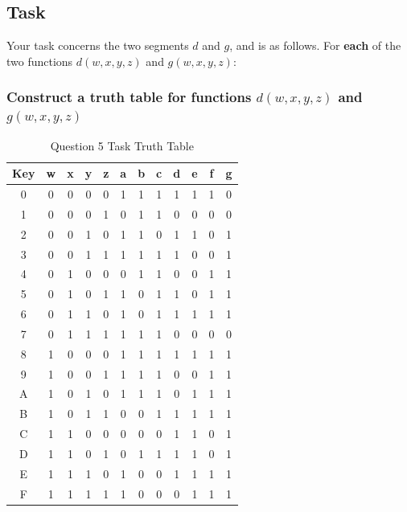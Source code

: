 \documentclass[12pt,a4paper]{article}
\begin{document}
\newpage
\subsection{Task}
Your task concerns the two segments $d$ and $g$, and is as follows. For \textbf{each} of the two functions $d(w,x,y,z)$ and $g(w,x,y,z)$:

\subsubsection{Construct a truth table for functions $d(w,x,y,z)$ and $g(w,x,y,z)$}

\begin{table}[h]
\centering
\caption{Question 5 Task Truth Table}
\begin{tabular}{c|c|c|c|c|c|c|c|c|c|c|c}
Key & w & x & y & z & a & b & c & d & e & f & g \\
\hline
0 & 0 & 0 & 0 & 0 & 1 & 1 & 1 & 1 & 1 & 1 & 0 \\
\hline
1 & 0 & 0 & 0 & 1 & 0 & 1 & 1 & 0 & 0 & 0 & 0 \\
\hline
2 & 0 & 0 & 1 & 0 & 1 & 1 & 0 & 1 & 1 & 0 & 1 \\
\hline
3 & 0 & 0 & 1 & 1 & 1 & 1 & 1 & 1 & 0 & 0 & 1 \\
\hline
4 & 0 & 1 & 0 & 0 & 0 & 1 & 1 & 0 & 0 & 1 & 1 \\
\hline
5 & 0 & 1 & 0 & 1 & 1 & 0 & 1 & 1 & 0 & 1 & 1 \\
\hline
6 & 0 & 1 & 1 & 0 & 1 & 0 & 1 & 1 & 1 & 1 & 1 \\
\hline
7 & 0 & 1 & 1 & 1 & 1 & 1 & 1 & 0 & 0 & 0 & 0 \\
\hline
8 & 1 & 0 & 0 & 0 & 1 & 1 & 1 & 1 & 1 & 1 & 1 \\
\hline
9 & 1 & 0 & 0 & 1 & 1 & 1 & 1 & 0 & 0 & 1 & 1 \\
\hline
A & 1 & 0 & 1 & 0 & 1 & 1 & 1 & 0 & 1 & 1 & 1 \\
\hline
B & 1 & 0 & 1 & 1 & 0 & 0 & 1 & 1 & 1 & 1 & 1 \\
\hline
C & 1 & 1 & 0 & 0 & 0 & 0 & 0 & 1 & 1 & 0 & 1 \\
\hline
D & 1 & 1 & 0 & 1 & 0 & 1 & 1 & 1 & 1 & 0 & 1 \\
\hline
E & 1 & 1 & 1 & 0 & 1 & 0 & 0 & 1 & 1 & 1 & 1 \\
\hline
F & 1 & 1 & 1 & 1 & 1 & 0 & 0 & 0 & 1 & 1 & 1 \\
\end{tabular}
\end{table}
\end{document}
